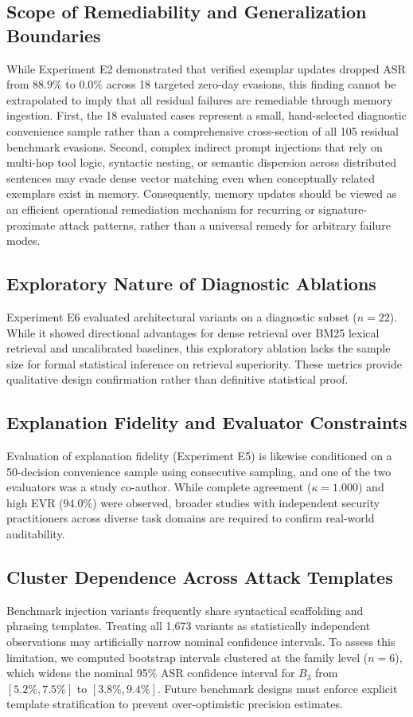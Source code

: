 \documentclass[conference]{IEEEtran}
\begin{document}
\subsection{Scope of Remediability and Generalization Boundaries}
While Experiment E2 demonstrated that verified exemplar updates dropped ASR from $88.9\%$ to $0.0\%$ across 18 targeted zero-day evasions, this finding cannot be extrapolated to imply that all residual failures are remediable through memory ingestion. First, the 18 evaluated cases represent a small, hand-selected diagnostic convenience sample rather than a comprehensive cross-section of all 105 residual benchmark evasions. Second, complex indirect prompt injections that rely on multi-hop tool logic, syntactic nesting, or semantic dispersion across distributed sentences may evade dense vector matching even when conceptually related exemplars exist in memory. Consequently, memory updates should be viewed as an efficient operational remediation mechanism for recurring or signature-proximate attack patterns, rather than a universal remedy for arbitrary failure modes.

\subsection{Exploratory Nature of Diagnostic Ablations}
Experiment E6 evaluated architectural variants on a diagnostic subset ($n=22$). While it showed directional advantages for dense retrieval over BM25 lexical retrieval and uncalibrated baselines, this exploratory ablation lacks the sample size for formal statistical inference on retrieval superiority. These metrics provide qualitative design confirmation rather than definitive statistical proof.

\subsection{Explanation Fidelity and Evaluator Constraints}
Evaluation of explanation fidelity (Experiment E5) is likewise conditioned on a 50-decision convenience sample using consecutive sampling, and one of the two evaluators was a study co-author. While complete agreement ($\kappa = 1.000$) and high EVR ($94.0\%$) were observed, broader studies with independent security practitioners across diverse task domains are required to confirm real-world auditability.

\subsection{Cluster Dependence Across Attack Templates}
Benchmark injection variants frequently share syntactical scaffolding and phrasing templates. Treating all 1,673 variants as statistically independent observations may artificially narrow nominal confidence intervals. To assess this limitation, we computed bootstrap intervals clustered at the family level ($n=6$), which widens the nominal 95\% ASR confidence interval for $B_3$ from $[5.2\%, 7.5\%]$ to $[3.8\%, 9.4\%]$. Future benchmark designs must enforce explicit template stratification to prevent over-optimistic precision estimates.
\end{document}

